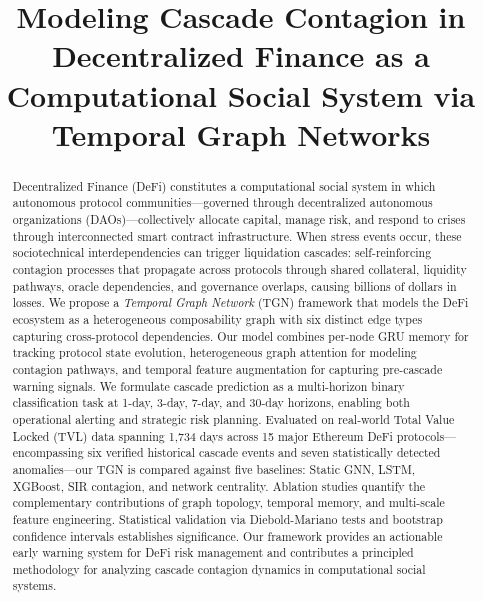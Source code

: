 \documentclass[journal]{IEEEtran}
\begin{document}
\title{Modeling Cascade Contagion in Decentralized Finance as a Computational Social System via Temporal Graph Networks}

\author{%
}

\maketitle

\begin{abstract}
Decentralized Finance (DeFi) constitutes a computational social system in which autonomous protocol communities---governed through decentralized autonomous organizations (DAOs)---collectively allocate capital, manage risk, and respond to crises through interconnected smart contract infrastructure.
When stress events occur, these sociotechnical interdependencies can trigger liquidation cascades: self-reinforcing contagion processes that propagate across protocols through shared collateral, liquidity pathways, oracle dependencies, and governance overlaps, causing billions of dollars in losses.
We propose a \emph{Temporal Graph Network} (TGN) framework that models the DeFi ecosystem as a heterogeneous composability graph with six distinct edge types capturing cross-protocol dependencies.
Our model combines per-node GRU memory for tracking protocol state evolution, heterogeneous graph attention for modeling contagion pathways, and temporal feature augmentation for capturing pre-cascade warning signals.
We formulate cascade prediction as a multi-horizon binary classification task at 1-day, 3-day, 7-day, and 30-day horizons, enabling both operational alerting and strategic risk planning.
Evaluated on real-world Total Value Locked (TVL) data spanning 1,734 days across 15 major Ethereum DeFi protocols---encompassing six verified historical cascade events and seven statistically detected anomalies---our TGN is compared against five baselines: Static GNN, LSTM, XGBoost, SIR contagion, and network centrality.
Ablation studies quantify the complementary contributions of graph topology, temporal memory, and multi-scale feature engineering.
Statistical validation via Diebold-Mariano tests and bootstrap confidence intervals establishes significance.
Our framework provides an actionable early warning system for DeFi risk management and contributes a principled methodology for analyzing cascade contagion dynamics in computational social systems.
\end{abstract}
\end{document}
